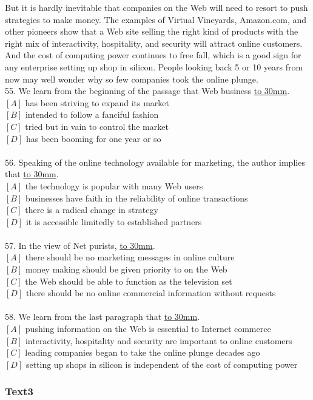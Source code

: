 \documentclass[a4paper]{article}
\begin{document}
\par
But it is hardly inevitable that companies on the Web will need to resort to push strategies to make money. The examples of Virtual Vineyards, Amazon.com, and other pioneers show that a Web site selling the right kind of products with the right mix of interactivity, hospitality, and security will attract online customers. And the cost of computing power continues to free fall, which is a good sign for any enterprise setting up shop in silicon. People looking back 5 or 10 years from now may well wonder why so few companies took the online plunge.
\\55.	We learn from the beginning of the passage that Web business \underline{\hbox to 30mm{}}.\\$[A]$ has been striving to expand its market\\$[B]$ intended to follow a fanciful fashion\\$[C]$ tried but in vain to control the market\\$[D]$ has been booming for one year or so\\\\56.	Speaking of the online technology available for marketing, the author implies that \underline{\hbox to 30mm{}}.\\$[A]$ the technology is popular with many Web users\\$[B]$ businesses have faith in the reliability of online transactions\\$[C]$ there is a radical change in strategy\\$[D]$ it is accessible limitedly to established partners\\\\57.	In the view of Net purists, \underline{\hbox to 30mm{}}.\\$[A]$ there should be no marketing messages in online culture\\$[B]$ money making should be given priority to on the Web\\$[C]$ the Web should be able to function as the television set\\$[D]$ there should be no online commercial information without requests\\\\58.	We learn from the last paragraph that \underline{\hbox to 30mm{}}.\\$[A]$ pushing information on the Web is essential to Internet commerce\\$[B]$ interactivity, hospitality and security are important to online customers\\$[C]$ leading companies began to take the online plunge decades ago\\$[D]$ setting up shops in silicon is independent of the cost of computing power\\\subsubsection{Text3}
\end{document}
